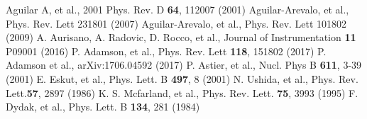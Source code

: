 \documentclass[12pt]{article}
\begin{document}
\begin{thebibliography}{9}

  Aguilar A, et al., 2001 Phys. Rev. D \textbf{64}, 112007 (2001)
 Aguilar-Arevalo, et al., Phys. Rev. Lett  231801 (2007)
 Aguilar-Arevalo, et al., Phys. Rev. Lett 101802 (2009)
A. Aurisano, A. Radovic, D. Rocco, et al., Journal of Instrumentation \textbf{11} P09001 (2016)
P. Adamson, et al., Phys. Rev. Lett \textbf{118}, 151802 (2017)
P. Adamson et al., arXiv:1706.04592 (2017)
 P. Astier, et al., Nucl. Phys B \textbf{611}, 3-39 (2001)
 E. Eskut, et al., Phys. Lett. B \textbf{497}, 8 (2001)
 N. Ushida, et al., Phys. Rev. Lett.\textbf{57},  2897 (1986)
 K. S. Mcfarland, et al., Phys. Rev. Lett. \textbf{75}, 3993 (1995)
 F. Dydak, et al., Phys. Lett. B \textbf{134}, 281 (1984)
\end{thebibliography}
\end{document}
